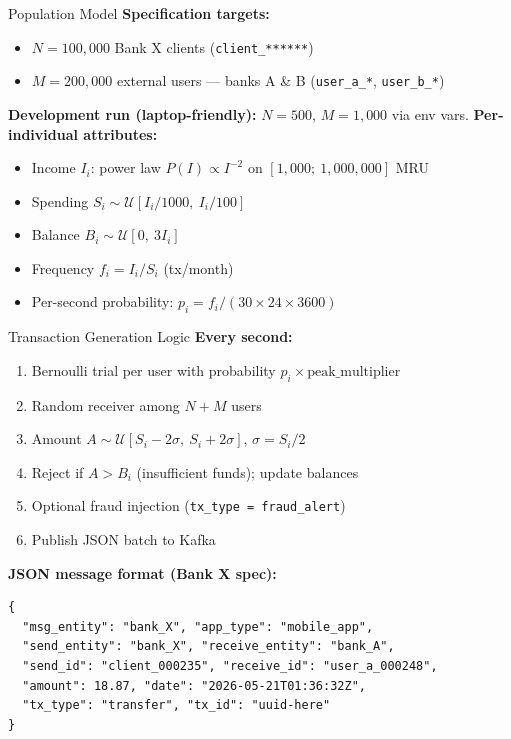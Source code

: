\documentclass[aspectratio=169,11pt]{beamer}
\begin{document}
\begin{frame}{Population Model}
  \textbf{Specification targets:}
  \begin{itemize}
    \item $N = 100{,}000$ Bank X clients (\texttt{client\_******})
    \item $M = 200{,}000$ external users — banks A \& B (\texttt{user\_a\_*}, \texttt{user\_b\_*})
  \end{itemize}
  \textbf{Development run (laptop-friendly):} $N{=}500$, $M{=}1{,}000$ via env vars.
  \vspace{0.5em}
  \textbf{Per-individual attributes:}
  \begin{itemize}
    \item Income $I_i$: power law $P(I) \propto I^{-2}$ on $[1{,}000;\ 1{,}000{,}000]$ MRU
    \item Spending $S_i \sim \mathcal{U}[I_i/1000,\ I_i/100]$
    \item Balance $B_i \sim \mathcal{U}[0,\ 3 I_i]$
    \item Frequency $f_i = I_i / S_i$ (tx/month)
    \item Per-second probability: $p_i = f_i / (30 \times 24 \times 3600)$
  \end{itemize}
\end{frame}

\begin{frame}{Transaction Generation Logic}
  \textbf{Every second:}
  \begin{enumerate}
    \item Bernoulli trial per user with probability $p_i \times \text{peak\_multiplier}$
    \item Random receiver among $N{+}M$ users
    \item Amount $A \sim \mathcal{U}[S_i - 2\sigma,\ S_i + 2\sigma]$, $\sigma = S_i/2$
    \item Reject if $A > B_i$ (insufficient funds); update balances
    \item Optional fraud injection (\texttt{tx\_type = fraud\_alert})
    \item Publish JSON batch to Kafka
  \end{enumerate}
  \vspace{0.4em}
  \textbf{JSON message format (Bank X spec):}
  \begin{lstlisting}[style=py,basicstyle=\ttfamily\tiny]
{
  "msg_entity": "bank_X", "app_type": "mobile_app",
  "send_entity": "bank_X", "receive_entity": "bank_A",
  "send_id": "client_000235", "receive_id": "user_a_000248",
  "amount": 18.87, "date": "2026-05-21T01:36:32Z",
  "tx_type": "transfer", "tx_id": "uuid-here"
}
  \end{lstlisting}
\end{frame}
\end{document}
